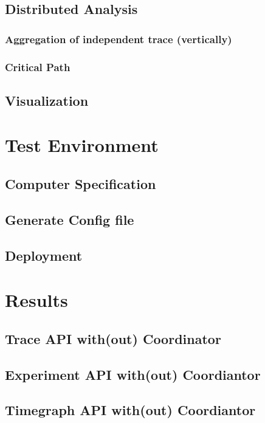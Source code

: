 \subsection{Distributed Analysis}

\subsubsection{Aggregation of independent trace (vertically)}

\subsubsection{Critical Path}

\subsection{Visualization}

\section{Test Environment}

\subsection{Computer Specification}

\subsection{Generate Config file}

\subsection{Deployment}

\section{Results}

\subsection{Trace API with(out) Coordinator}

\subsection{Experiment API with(out) Coordiantor}

\subsection{Timegraph API with(out) Coordiantor}

